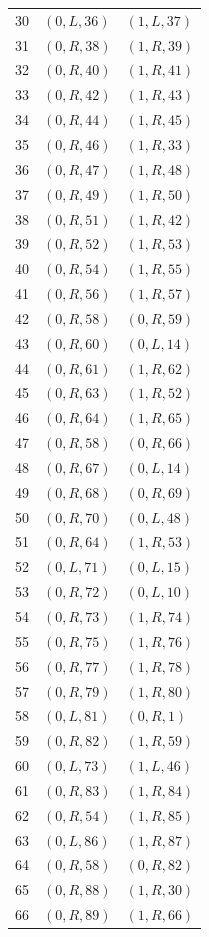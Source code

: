 \begin{longtable}{@{}rll@{}}
30 & $(0,L,36)$ & $(1,L,37)$\\
31 & $(0,R,38)$ & $(1,R,39)$\\
32 & $(0,R,40)$ & $(1,R,41)$\\
33 & $(0,R,42)$ & $(1,R,43)$\\
34 & $(0,R,44)$ & $(1,R,45)$\\
35 & $(0,R,46)$ & $(1,R,33)$\\
36 & $(0,R,47)$ & $(1,R,48)$\\
37 & $(0,R,49)$ & $(1,R,50)$\\
38 & $(0,R,51)$ & $(1,R,42)$\\
39 & $(0,R,52)$ & $(1,R,53)$\\
40 & $(0,R,54)$ & $(1,R,55)$\\
41 & $(0,R,56)$ & $(1,R,57)$\\
42 & $(0,R,58)$ & $(0,R,59)$\\
43 & $(0,R,60)$ & $(0,L,14)$\\
44 & $(0,R,61)$ & $(1,R,62)$\\
45 & $(0,R,63)$ & $(1,R,52)$\\
46 & $(0,R,64)$ & $(1,R,65)$\\
47 & $(0,R,58)$ & $(0,R,66)$\\
48 & $(0,R,67)$ & $(0,L,14)$\\
49 & $(0,R,68)$ & $(0,R,69)$\\
50 & $(0,R,70)$ & $(0,L,48)$\\
51 & $(0,R,64)$ & $(1,R,53)$\\
52 & $(0,L,71)$ & $(0,L,15)$\\
53 & $(0,R,72)$ & $(0,L,10)$\\
54 & $(0,R,73)$ & $(1,R,74)$\\
55 & $(0,R,75)$ & $(1,R,76)$\\
56 & $(0,R,77)$ & $(1,R,78)$\\
57 & $(0,R,79)$ & $(1,R,80)$\\
58 & $(0,L,81)$ & $(0,R,1)$\\
59 & $(0,R,82)$ & $(1,R,59)$\\
60 & $(0,L,73)$ & $(1,L,46)$\\
61 & $(0,R,83)$ & $(1,R,84)$\\
62 & $(0,R,54)$ & $(1,R,85)$\\
63 & $(0,L,86)$ & $(1,R,87)$\\
64 & $(0,R,58)$ & $(0,R,82)$\\
65 & $(0,R,88)$ & $(1,R,30)$\\
66 & $(0,R,89)$ & $(1,R,66)$\\

\end{longtable}
